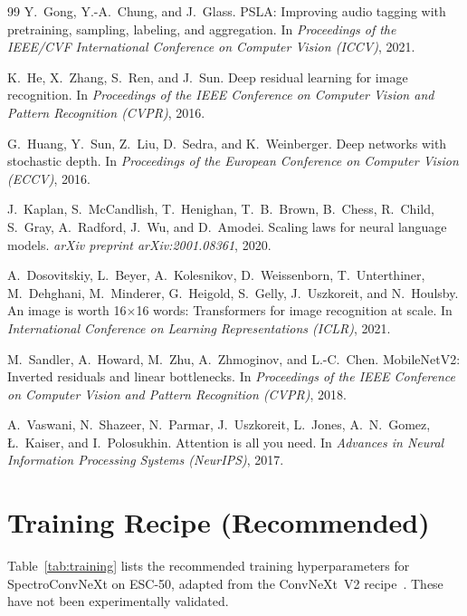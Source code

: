 \documentclass{article}
\begin{document}
{\begin{thebibliography}{99}
Y.~Gong, Y.-A.~Chung, and J.~Glass.
PSLA: Improving audio tagging with pretraining, sampling, labeling, and aggregation.
In \textit{Proceedings of the IEEE/CVF International Conference on Computer Vision (ICCV)}, 2021.

K.~He, X.~Zhang, S.~Ren, and J.~Sun.
Deep residual learning for image recognition.
In \textit{Proceedings of the IEEE Conference on Computer Vision and Pattern Recognition (CVPR)}, 2016.

G.~Huang, Y.~Sun, Z.~Liu, D.~Sedra, and K.~Weinberger.
Deep networks with stochastic depth.
In \textit{Proceedings of the European Conference on Computer Vision (ECCV)}, 2016.

J.~Kaplan, S.~McCandlish, T.~Henighan, T.~B.~Brown, B.~Chess, R.~Child, S.~Gray,
A.~Radford, J.~Wu, and D.~Amodei.
Scaling laws for neural language models.
\emph{arXiv preprint arXiv:2001.08361}, 2020.

A.~Dosovitskiy, L.~Beyer, A.~Kolesnikov, D.~Weissenborn, T.~Unterthiner,
M.~Dehghani, M.~Minderer, G.~Heigold, S.~Gelly, J.~Uszkoreit, and N.~Houlsby.
An image is worth 16$\times$16 words: Transformers for image recognition at scale.
In \textit{International Conference on Learning Representations (ICLR)}, 2021.

M.~Sandler, A.~Howard, M.~Zhu, A.~Zhmoginov, and L.-C.~Chen.
MobileNetV2: Inverted residuals and linear bottlenecks.
In \textit{Proceedings of the IEEE Conference on Computer Vision and Pattern Recognition (CVPR)}, 2018.

A.~Vaswani, N.~Shazeer, N.~Parmar, J.~Uszkoreit, L.~Jones, A.~N.~Gomez,
{\L}.~Kaiser, and I.~Polosukhin.
Attention is all you need.
In \textit{Advances in Neural Information Processing Systems (NeurIPS)}, 2017.

\end{thebibliography}
}

\appendix
\section{Training Recipe (Recommended)}

Table~\ref{tab:training} lists the recommended training hyperparameters for
SpectroConvNeXt on ESC-50, adapted from the ConvNeXt~V2
recipe~\cite{woo2023convnextv2}. These have not been experimentally validated.
\end{document}
